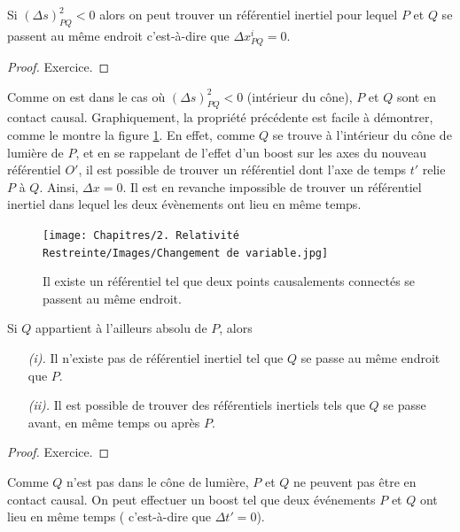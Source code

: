 \begin{theoremframe}
    \begin{propri}
        Si $(\Delta s)^2_{PQ} < 0$ alors on peut trouver un référentiel inertiel pour lequel $P$ et $Q$ se passent au même endroit c'est-à-dire que $\Delta x^{i}_{PQ }= 0$.
    \end{propri}
\end{theoremframe}
\begin{proof}
    Exercice.
\end{proof}
    Comme on est dans le cas où $(\Delta s)^2_{PQ} < 0$ (intérieur du cône), $P$ et $Q$ sont en contact causal. Graphiquement, la propriété précédente est facile à démontrer, comme le montre la figure \ref{fig:2.2}. En effet, comme $Q$ se trouve à l'intérieur du cône de lumière de $P$, et en se rappelant de l'effet d'un boost sur les axes du nouveau référentiel $O'$, il est possible de trouver un référentiel dont l'axe de temps $t'$ relie $P$ à $Q$. Ainsi, $\Delta x = 0$. Il est en revanche impossible de trouver un référentiel inertiel dans lequel les deux évènements ont lieu en même temps.
\begin{figure}[H]
    \begin{center}
        \texttt{[image: Chapitres/2. Relativité Restreinte/Images/Changement de variable.jpg]}
        \caption{Il existe un référentiel tel que deux points causalements connectés se passent au même endroit.}
        \label{fig:2.2}
    \end{center}
\end{figure}

\begin{theoremframe}
    \begin{propri}
        Si $Q$ appartient à l'ailleurs absolu de $P$, alors
        \begin{itemize}
            \item[\emph{(i).}] Il n'existe pas de référentiel inertiel tel que $Q$ se passe au même endroit que $P$.
            \item[\emph{(ii).}] Il est possible de trouver des référentiels inertiels tels que $Q$ se passe avant, en même temps ou après $P$.
        \end{itemize}
    \end{propri}
\end{theoremframe}
\begin{proof}
    Exercice.
\end{proof}

    Comme $Q$ n'est pas dans le cône de lumière, $P$ et $Q$ ne peuvent pas être en contact causal. On peut effectuer un boost tel que deux événements $P$ et $Q$ ont lieu en même temps ( c'est-à-dire que $\Delta t' = 0$). 

